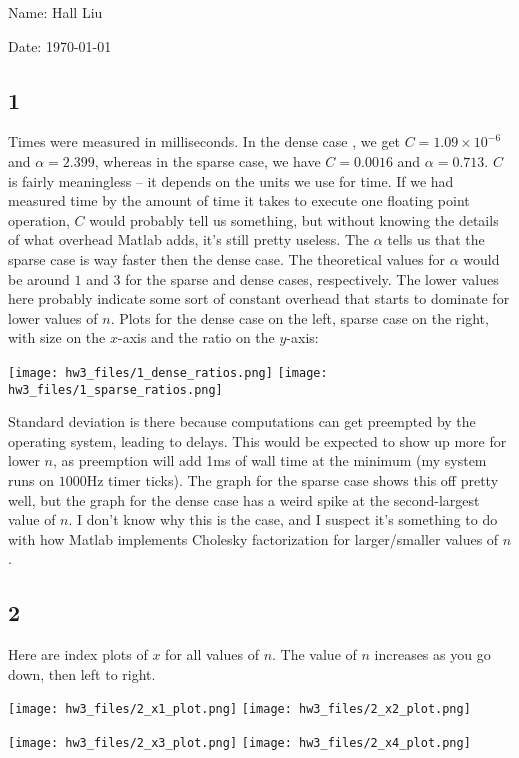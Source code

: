 \documentclass{article}
\begin{document}
Name: Hall Liu

Date: \today 

\subsection*{1}
Times were measured in milliseconds. In the dense case , we get $C=1.09\times10^{-6}$ and $\alpha=2.399$, whereas in the sparse case, we have $C=0.0016$ and $\alpha=0.713$. $C$ is fairly meaningless -- it depends on the units we use for time. If we had measured time by the amount of time it takes to execute one floating point operation, $C$ would probably tell us something, but without knowing the details of what overhead Matlab adds, it's still pretty useless. The $\alpha$ tells us that the sparse case is way faster then the dense case. The theoretical values for $\alpha$ would be around $1$ and $3$ for the sparse and dense cases, respectively. The lower values here probably indicate some sort of constant overhead that starts to dominate for lower values of $n$.
Plots for the dense case on the left, sparse case on the right, with size on the $x$-axis and the ratio on the $y$-axis:

\texttt{[image: hw3\_files/1\_dense\_ratios.png]}
\texttt{[image: hw3\_files/1\_sparse\_ratios.png]}

Standard deviation is there because computations can get preempted by the operating system, leading to delays. This would be expected to show up more for lower $n$, as preemption will add 1ms of wall time at the minimum (my system runs on $1000$Hz timer ticks). The graph for the sparse case shows this off pretty well, but the graph for the dense case has a weird spike at the second-largest value of $n$. I don't know why this is the case, and I suspect it's something to do with how Matlab implements Cholesky factorization for larger/smaller values of $n$.
\subsection*{2}
Here are index plots of $x$ for all values of $n$. The value of $n$ increases as you go down, then left to right.

\texttt{[image: hw3\_files/2\_x1\_plot.png]}
\texttt{[image: hw3\_files/2\_x2\_plot.png]}

\texttt{[image: hw3\_files/2\_x3\_plot.png]}
\texttt{[image: hw3\_files/2\_x4\_plot.png]}
\end{document}
